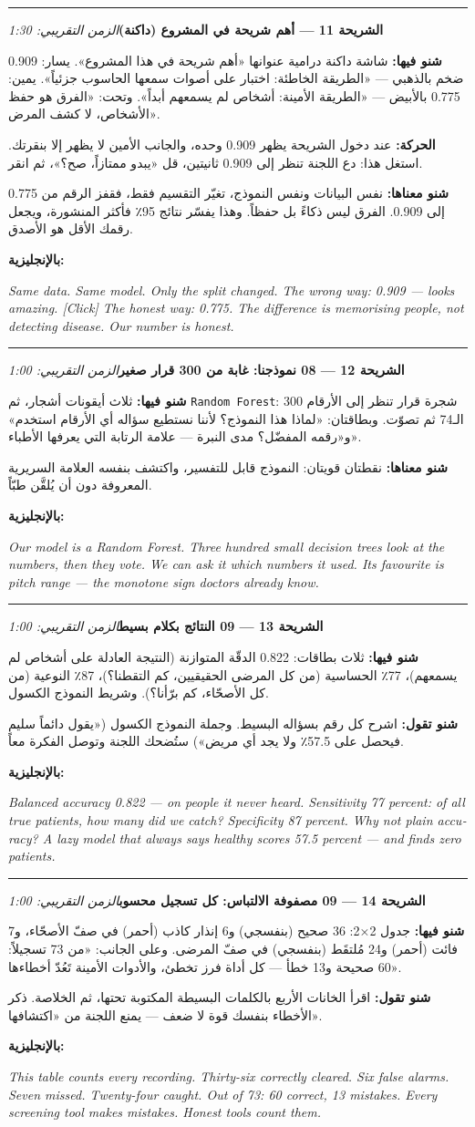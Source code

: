 \documentclass[12pt,a4paper]{article}
\newcommand{\E}[1]{\textenglish{\texttt{#1}}}
\newcommand{\N}[1]{\textenglish{#1}}
\newcommand{\slayd}[3]{%
  \par\vspace{10pt}\hrule\vspace{8pt}%
  {\large\textbf{الشريحة #1 — #2}}\hfill{\small\textit{الزمن التقريبي: #3}}\par\vspace{4pt}%
}
\newcommand{\fiha}{\textbf{شنو فيها: }}
\newcommand{\managementhaha}{\textbf{شنو معناها: }}
\newcommand{\tqul}{\textbf{شنو تقول: }}
\newcommand{\bilinglizi}[1]{\par\textbf{بالإنجليزية:}\par
  \begin{english}\small\itshape #1\end{english}\par}
\begin{document}
\slayd{\N{11}}{أهم شريحة في المشروع (داكنة)}{\N{1:30}}
\fiha شاشة داكنة درامية عنوانها «أهم شريحة في هذا المشروع». يسار:
\N{0.909} ضخم بالذهبي — «الطريقة الخاطئة: اختبار على أصوات سمعها الحاسوب
جزئياً». يمين: \N{0.775} بالأبيض — «الطريقة الأمينة: أشخاص لم يسمعهم
أبداً». وتحت: «الفرق هو حفظ الأشخاص، لا كشف المرض».
\par\textbf{الحركة:} عند دخول الشريحة يظهر \N{0.909} وحده، والجانب
الأمين لا يظهر إلا بنقرتك. استغل هذا: دع اللجنة تنظر إلى \N{0.909}
ثانيتين، قل «يبدو ممتازاً، صح؟»، ثم انقر.
\par\managementhaha نفس البيانات ونفس النموذج، تغيّر التقسيم فقط، فقفز
الرقم من \N{0.775} إلى \N{0.909}. الفرق ليس ذكاءً بل حفظاً. وهذا يفسّر
نتائج \N{95}٪ فأكثر المنشورة، ويجعل رقمك الأقل هو الأصدق.
\bilinglizi{Same data. Same model. Only the split changed. The wrong
way: 0.909 --- looks amazing. [Click] The honest way: 0.775. The
difference is memorising people, not detecting disease. Our number is
honest.}

\slayd{\N{12}}{\N{08} نموذجنا: غابة من \N{300} قرار صغير}{\N{1:00}}
\fiha ثلاث أيقونات أشجار، ثم \E{Random Forest}: \N{300} شجرة قرار تنظر
إلى الأرقام الـ\N{74} ثم تصوّت. وبطاقتان: «لماذا هذا النموذج؟ لأننا
نستطيع سؤاله أي الأرقام استخدم» و«رقمه المفضّل؟ مدى النبرة — علامة
الرتابة التي يعرفها الأطباء».
\par\managementhaha نقطتان قويتان: النموذج قابل للتفسير، واكتشف بنفسه
العلامة السريرية المعروفة دون أن يُلقَّن طبّاً.
\bilinglizi{Our model is a Random Forest. Three hundred small decision
trees look at the numbers, then they vote. We can ask it which numbers
it used. Its favourite is pitch range --- the monotone sign doctors
already know.}

\slayd{\N{13}}{\N{09} النتائج بكلام بسيط}{\N{1:00}}
\fiha ثلاث بطاقات: \N{0.822} الدقّة المتوازنة (النتيجة العادلة على أشخاص
لم يسمعهم)، \N{77}٪ الحساسية (من كل المرضى الحقيقيين، كم التقطنا؟)،
\N{87}٪ النوعية (من كل الأصحّاء، كم برّأنا؟). وشريط النموذج الكسول.
\par\tqul اشرح كل رقم بسؤاله البسيط. وجملة النموذج الكسول («يقول دائماً
سليم فيحصل على \N{57.5}٪ ولا يجد أي مريض») ستُضحك اللجنة وتوصل الفكرة
معاً.
\bilinglizi{Balanced accuracy 0.822 --- on people it never heard.
Sensitivity 77 percent: of all true patients, how many did we catch?
Specificity 87 percent. Why not plain accuracy? A lazy model that always
says healthy scores 57.5 percent --- and finds zero patients.}

\slayd{\N{14}}{\N{09} مصفوفة الالتباس: كل تسجيل محسوب}{\N{1:00}}
\fiha جدول \N{2}×\N{2}: \N{36} صحيح (بنفسجي) و\N{6} إنذار كاذب (أحمر)
في صفّ الأصحّاء، و\N{7} فائت (أحمر) و\N{24} مُلتقَط (بنفسجي) في صفّ
المرضى. وعلى الجانب: «من \N{73} تسجيلاً: \N{60} صحيحة و\N{13} خطأ — كل
أداة فرز تخطئ، والأدوات الأمينة تَعُدّ أخطاءها».
\par\tqul اقرأ الخانات الأربع بالكلمات البسيطة المكتوبة تحتها، ثم
الخلاصة. ذكر الأخطاء بنفسك قوة لا ضعف — يمنع اللجنة من «اكتشافها».
\bilinglizi{This table counts every recording. Thirty-six correctly
cleared. Six false alarms. Seven missed. Twenty-four caught. Out of 73:
60 correct, 13 mistakes. Every screening tool makes mistakes. Honest
tools count them.}
\end{document}
